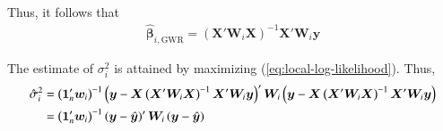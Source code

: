 \documentclass[authoryear, review, 11pt]{elsarticle}
\begin{document}
	Thus, it follows that
	\begin{align}
		\hat{\bm{\beta}}_{i, \text{GWR}} = \left( \bm{X}'\bm{W}_i\bm{X} \right)^{-1} \bm{X}'\bm{W}_i\bm{y}
	\end{align}
	
	The estimate of $\sigma_i^2$ is attained by maximizing (\ref{eq:local-log-likelihood}). Thus,
	\begin{align}
		\hat{\sigma}^2_i &= \left(\bm{1}_n'\bm{w}_i \right)^{-1} \left(\bm{y}-\bm{X}\left(\bm{X}'\bm{W}_i\bm{X}\right)^{-1}\bm{X}'\bm{W}_i\bm{y}\right)' \bm{W}_i \left(\bm{y}-\bm{X}\left(\bm{X}'\bm{W}_i\bm{X}\right)^{-1}\bm{X}'\bm{W}_i\bm{y}\right) \notag \\
		&= \left(\bm{1}_n'\bm{w}_i \right)^{-1}  \left(\bm{y}-\hat{\bm{y}}\right)' \bm{W}_i \left(\bm{y}-\hat{\bm{y}}\right)
	\end{align}
	
\end{document}
